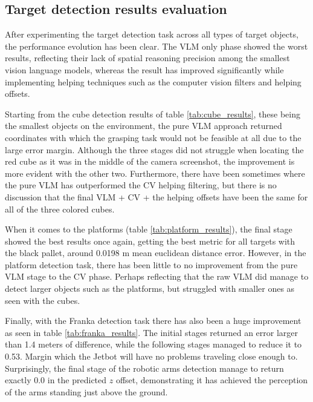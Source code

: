 
\subsection{Target detection results evaluation}
After experimenting the target detection task across all types of target objects, the performance evolution has been clear. The VLM only phase showed the worst results, reflecting their lack of spatial reasoning precision among the smallest vision language models, whereas the result has improved significantly while implementing helping techniques such as the computer vision filters and helping offsets. 

Starting from the cube detection results of table \ref{tab:cube_results}, these being the smallest objects on the environment, the pure VLM approach returned coordinates with which the grasping task would not be feasible at all due to the large error margin. Although the three stages did not struggle when locating the red cube as it was in the middle of the camera screenshot, the improvement is more evident with the other two. Furthermore, there have been sometimes where the pure VLM has outperformed the CV helping filtering, but there is no discussion that the final VLM + CV + the helping offsets have been the same for all of the three colored cubes. 

When it comes to the platforms (table \ref{tab:platform_results}), the final stage showed the best results once again, getting the best metric for all targets with the black pallet, around 0.0198 m mean euclidean distance error. However, in the platform detection task, there has been little to no improvement from the pure VLM stage to the CV phase. Perhaps reflecting that the raw VLM did manage to detect larger objects such as the platforms, but struggled with smaller ones as seen with the cubes. 

Finally, with the Franka detection task there has also been a huge improvement as seen in table \ref{tab:franka_results}. The initial stages returned an error larger than 1.4 meters of difference, while the following stages managed to reduce it to 0.53. Margin which the Jetbot will have no problems traveling close enough to. Surprisingly, the final stage of the robotic arms detection manage to return exactly 0.0 in the predicted $z$ offset, demonstrating it has achieved the perception of the arms standing just above the ground. 

